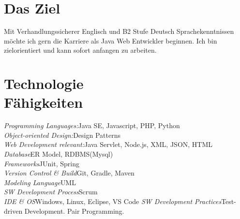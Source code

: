 \documentclass[margin, 10pt]{res} %
\begin{document}
\begin{resume}

 
\section{Das Ziel}  


Mit Verhandlungssicherer Englisch und B2 Stufe Deutsch Sprachekenntnissen möchte ich gern die Karriere als Java\/ Web Entwickler beginnen. Ich bin zielorientiert und kann sofort anfangen zu arbeiten.

\newcommand\tab[1][1cm]{\hspace*{#1}}
\section{Technologie \\ Fähigkeiten} 

{\sl Programming Languages:}\hfill		Java SE, Javascript, PHP, Python\\
{\sl Object-oriented Design:}\hfill 		Design Patterns\\
{\sl Web Development relevant:}\hfill 	Java Servlet, Node.js, XML, JSON, HTML\\
{\sl Database}\hfill 						ER Model, RDBMS(Mysql)\\ 
{\sl Frameworks}\hfill  					JUnit, Spring\\
{\sl Version Control \& Build}\hfill 	Git, Gradle, Maven\\
{\sl Modeling Language}\hfill 				UML\\
{\sl SW Development Process}\hfill 		Scrum\\
{\sl IDE \& OS}\hfill  					Windows, Linux, Eclipse, VS Code
{\sl SW Development Practices}\hfill	Test-driven Development. Pair Programming.


\end{resume}
\end{document}
